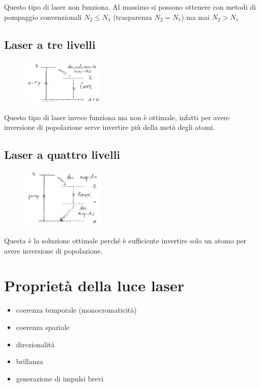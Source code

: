 Questo tipo di laser non funziona. Al massimo si possono ottenere con metodi di pompaggio convenzionali $N_2 \leq N_1$ (trasparenza $N_2 = N_1$) ma mai $N_2 > N_1$

\subsection{Laser a tre livelli}

\begin{figure}[H]
    \centering
    \includegraphics[width=4cm]{tre_livelli}
\end{figure}

Questo tipo di laser invece funziona ma non è ottimale, infatti per avere inversione di popolazione serve invertire più della metà degli atomi.

\subsection{Laser a quattro livelli}

\begin{figure}[H]
    \centering
    \includegraphics[width=4cm]{quattro_livelli}
\end{figure}

Questa è la soluzione ottimale perché è sufficiente invertire solo un atomo per avere inversione di popolazione.

\section{Proprietà della luce laser}

\begin{itemize}
    \item coerenza temporale (monocromaticità)
    \item coerenza spaziale
    \item direzionalità
    \item brillanza
    \item generazione di impulsi brevi
\end{itemize}